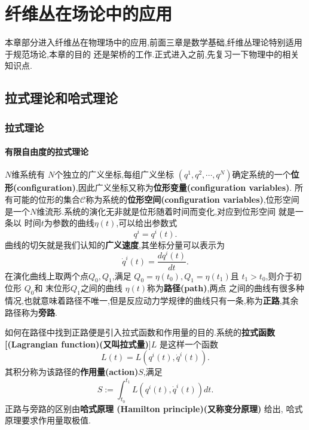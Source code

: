 \documentclass[../main.tex]{subfiles}
\begin{document}
 \hypersetup{pageanchor=true}
 \part{纤维丛在场论中的应用}
本章部分进入纤维丛在物理场中的应用,前面三章是数学基础,纤维丛理论特别适用于规范场论,本章的目的
还是架桥的工作.正式进入之前,先复习一下物理中的相关知识点.
\chapter{拉式理论和哈式理论}
\section{拉式理论}
\subsection{有限自由度的拉式理论}
$N$维系统有 $N$个独立的广义坐标,每组广义坐标 $(q^1,q^2,\cdots,q^N)$确定系统的一个\textbf{位形(configuration)},因此广义坐标又称为\textbf{位形变量(configuration variables)}.
所有可能的位形的集合$\mathscr{C}$称为系统的\textbf{位形空间(configuration variables)},位形空间是一个$N$维流形.系统的演化无非就是位形随着时间而变化,对应到位形空间
就是一条以 时间$t$为参数的曲线$\eta(t)$,可以给出参数式 \[q^i = q^i(t).\]曲线的切矢就是我们认知的\textbf{广义速度},其坐标分量可以表示为 \[
\dot{q}^i(t) = \frac{d q^i(t)}{dt}
.\] 
在演化曲线上取两个点$Q_0,Q_1$,满足 $Q_0 = \eta(t_0), Q_1 = \eta(t_1)$且 $t_1>t_0$,则介于初位形 $Q_0$和 末位形$Q_1$之间的曲线 $\eta(t)$称为\textbf{路径(path)},两点
之间的曲线有很多种情况,也就意味着路径不唯一,但是反应动力学规律的曲线只有一条,称为\textbf{正路},其余路径称为\textbf{旁路}. 

如何在路径中找到正路便是引入拉式函数和作用量的目的.系统的\textbf{拉式函数[(Lagrangian function)(又叫拉式量)}]$L$ 是这样一个函数\[
  L(t) = L(q^i(t), \dot{q}^i(t))
.\] 
其积分称为该路径的\textbf{作用量(action)}$S$,满足 \[
  S := \int^{t_1}_{t_0} L(q^i(t), \dot{q}^i(t))dt
.\] 
正路与旁路的区别由\textbf{哈式原理 (Hamilton principle)(又称变分原理)} 给出, 哈式原理要求作用量取极值.
\end{document}

